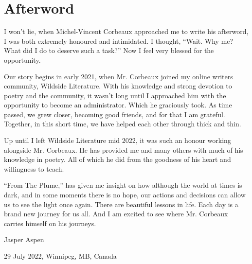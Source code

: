 \chapter*{Afterword}

I won’t lie, when Michel-Vincent Corbeaux approached me to write his afterword, I was both extremely honoured and intimidated. I thought, “Wait. Why me? What did I do to deserve such a task?” Now I feel very blessed for the opportunity. 


Our story begins in early 2021, when Mr. Corbeaux joined my online writers community, Wildside Literature. With his knowledge and strong devotion to poetry and the community, it wasn’t long until I approached him with the opportunity to become an administrator. Which he graciously took. As time passed, we grew closer, becoming good friends, and for that I am grateful. Together, in this short time, we have helped each other through thick and thin. 


Up until I left Wildside Literature mid 2022, it was such an honour working alongside Mr. Corbeaux. He has provided me and many others with much of his knowledge in poetry. All of which he did from the goodness of his heart and willingness to teach.


“From The Plume,” has given me insight on how although the world at times is dark, and in some moments there is no hope, our actions and decisions can allow us to see the light once again. There are beautiful lessons in life. Each day is a brand new journey for us all. And I am excited to see where Mr. Corbeaux carries himself on his journeys.

\vspace{1em}

Jasper Aspen

29 July 2022, Winnipeg, MB, Canada
